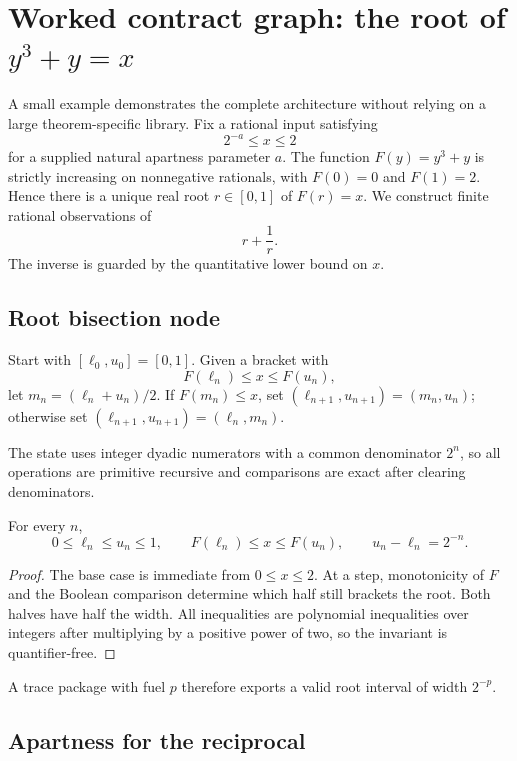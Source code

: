 \section{Worked contract graph: the root of \texorpdfstring{\(y^3+y=x\)}{y cubed plus y equals x}}
\label{sec:example}

A small example demonstrates the complete architecture without relying on a
large theorem-specific library.  Fix a rational input satisfying
\[
  2^{-a}\leq x\leq2
\]
for a supplied natural apartness parameter \(a\).  The function
\(F(y)=y^3+y\) is strictly increasing on nonnegative rationals, with
\(F(0)=0\) and \(F(1)=2\).  Hence there is a unique real root \(r\in[0,1]\)
of \(F(r)=x\).  We construct finite rational observations of
\[
  r+\frac1r.
\]
The inverse is guarded by the quantitative lower bound on \(x\).

\subsection{Root bisection node}

Start with \([\ell_0,u_0]=[0,1]\).  Given a bracket with
\[
 F(\ell_n)\leq x\leq F(u_n),
\]
let \(m_n=(\ell_n+u_n)/2\).  If \(F(m_n)\leq x\), set
\((\ell_{n+1},u_{n+1})=(m_n,u_n)\); otherwise set
\((\ell_{n+1},u_{n+1})=(\ell_n,m_n)\).

The state uses integer dyadic numerators with a common denominator \(2^n\), so
all operations are primitive recursive and comparisons are exact after
clearing denominators.

\begin{lemma}
For every \(n\),
\[
 0\leq\ell_n\leq u_n\leq1,
 \qquad F(\ell_n)\leq x\leq F(u_n),
 \qquad u_n-\ell_n=2^{-n}.
\]
\end{lemma}

\begin{proof}
The base case is immediate from \(0\leq x\leq2\).  At a step, monotonicity of
\(F\) and the Boolean comparison determine which half still brackets the
root.  Both halves have half the width.  All inequalities are polynomial
inequalities over integers after multiplying by a positive power of two, so
the invariant is quantifier-free.
\end{proof}

A trace package with fuel \(p\) therefore exports a valid root interval of
width \(2^{-p}\).

\subsection{Apartness for the reciprocal}

